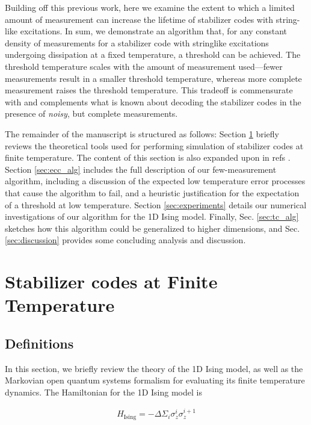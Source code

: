 \documentclass[twocolumn,superscriptaddress,aps,prb,floatfix]{revtex4-1}
\newcommand{\Hising}{H_{\mathrm{Ising}}}
\begin{document}
 Building off this previous work, here we examine the extent to which a limited amount of measurement can increase the lifetime of stabilizer codes with string-like excitations.  In sum, we demonstrate an algorithm that, for any constant density of measurements for a stabilizer code with stringlike excitations undergoing dissipation at a fixed temperature, a threshold can be achieved.  The threshold temperature scales with the amount of measurement used---fewer measurements result in a smaller threshold temperature, whereas more complete measurement raises the threshold temperature.  This tradeoff is commensurate with and complements what is known about decoding the stabilizer codes in the presence of \emph{noisy}, but complete measurements\cite{Nickerson2016}.
 
 The remainder of the manuscript is structured as follows:  Section \ref{sec:stabfintemp} briefly reviews the theoretical tools used for performing simulation of stabilizer codes at finite temperature.  The content of this section is also expanded upon in refs \cite{Freeman2014,Freeman2016}.  Section \ref{sec:ecc_alg} includes the full description of our few-measurement algorithm, including a discussion of the expected low temperature error processes that cause the algorithm to fail, and a heuristic justification for the expectation of a threshold at low temperature.  Section \ref{sec:experiments} details our numerical investigations of our algorithm for the 1D Ising model.  Finally, Sec. \ref{sec:tc_alg} sketches how this algorithm could be generalized to higher dimensions, and Sec. \ref{sec:discussion} provides some concluding analysis and discussion.

\section{Stabilizer codes at Finite Temperature}
\label{sec:stabfintemp}

\subsection{Definitions}
\label{sec:Defs}
In this section, we briefly review the theory of the 1D Ising model, as well as the Markovian open quantum systems formalism for evaluating its finite temperature dynamics.  The Hamiltonian for the 1D Ising model is

\begin{align}
\Hising = -\Delta \Sigma_i \sigma^i_z \sigma^{i+1}_z
\label{eq:isingham}
\end{align}
\end{document}

